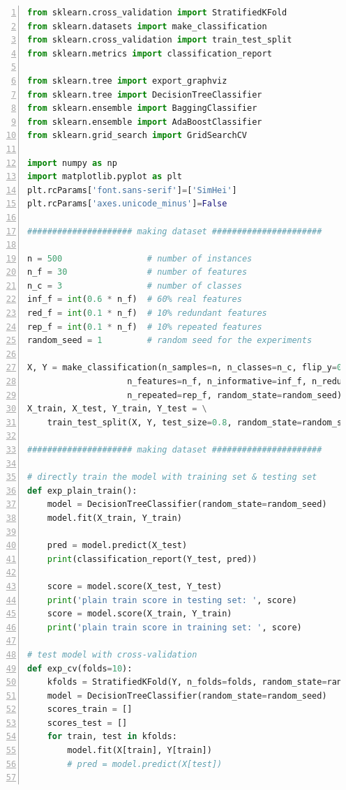 \documentclass[12pt,a4paper]{article}
\theoremstyle{definition}
\begin{document}
\begin{appendix}
	\begin{lstlisting}[language=Python,
	numbers=left,
	keywordstyle=\color{blue!70},
	frame=shadowbox,
	breaklines=True]
from sklearn.cross_validation import StratifiedKFold
from sklearn.datasets import make_classification
from sklearn.cross_validation import train_test_split
from sklearn.metrics import classification_report

from sklearn.tree import export_graphviz
from sklearn.tree import DecisionTreeClassifier
from sklearn.ensemble import BaggingClassifier
from sklearn.ensemble import AdaBoostClassifier
from sklearn.grid_search import GridSearchCV

import numpy as np
import matplotlib.pyplot as plt
plt.rcParams['font.sans-serif']=['SimHei']
plt.rcParams['axes.unicode_minus']=False

##################### making dataset ######################

n = 500                 # number of instances
n_f = 30                # number of features
n_c = 3                 # number of classes
inf_f = int(0.6 * n_f)  # 60% real features
red_f = int(0.1 * n_f)  # 10% redundant features
rep_f = int(0.1 * n_f)  # 10% repeated features
random_seed = 1         # random seed for the experiments

X, Y = make_classification(n_samples=n, n_classes=n_c, flip_y=0.03,
                    n_features=n_f, n_informative=inf_f, n_redundant=red_f,
                    n_repeated=rep_f, random_state=random_seed)
X_train, X_test, Y_train, Y_test = \
    train_test_split(X, Y, test_size=0.8, random_state=random_seed)

##################### making dataset ######################

# directly train the model with training set & testing set
def exp_plain_train():
    model = DecisionTreeClassifier(random_state=random_seed)
    model.fit(X_train, Y_train)

    pred = model.predict(X_test)
    print(classification_report(Y_test, pred))

    score = model.score(X_test, Y_test)
    print('plain train score in testing set: ', score)
    score = model.score(X_train, Y_train)
    print('plain train score in training set: ', score)

# test model with cross-validation
def exp_cv(folds=10):
    kfolds = StratifiedKFold(Y, n_folds=folds, random_state=random_seed)
    model = DecisionTreeClassifier(random_state=random_seed)
    scores_train = []
    scores_test = []
    for train, test in kfolds:
        model.fit(X[train], Y[train])
        # pred = model.predict(X[test])


\end{lstlisting}
\end{appendix}
\end{document}
